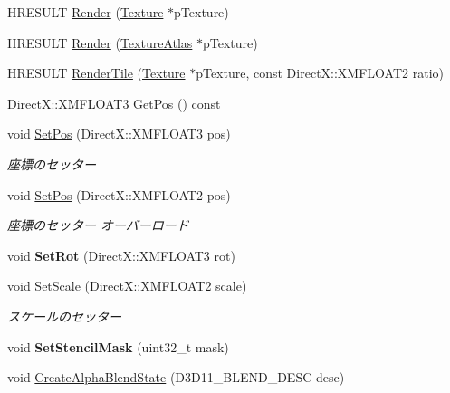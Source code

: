 \begin{DoxyCompactItemize}
\item 
H\+R\+E\+S\+U\+LT \hyperlink{class_a_p_i_1_1_sprite_af9c6b795e8d45972269d3fdc8cf9a3c4}{Render} (\hyperlink{class_a_p_i_1_1_texture}{Texture} $\ast$p\+Texture)
\item 
H\+R\+E\+S\+U\+LT \hyperlink{class_a_p_i_1_1_sprite_abea1a725dece7f8198dd4f0f9e95afb8}{Render} (\hyperlink{class_a_p_i_1_1_texture_atlas}{Texture\+Atlas} $\ast$p\+Texture)
\item 
H\+R\+E\+S\+U\+LT \hyperlink{class_a_p_i_1_1_sprite_a0d7e8aacecb8e343ea166b614398ce12}{Render\+Tile} (\hyperlink{class_a_p_i_1_1_texture}{Texture} $\ast$p\+Texture, const Direct\+X\+::\+X\+M\+F\+L\+O\+A\+T2 ratio)
\item 
Direct\+X\+::\+X\+M\+F\+L\+O\+A\+T3 \hyperlink{class_a_p_i_1_1_sprite_a471a0be5d782804468865b18a3eca5f1}{Get\+Pos} () const 
\item 
void \hyperlink{class_a_p_i_1_1_sprite_a966d3c6ff7e6bee56d3d8576d4585037}{Set\+Pos} (Direct\+X\+::\+X\+M\+F\+L\+O\+A\+T3 pos)\hypertarget{class_a_p_i_1_1_sprite_a966d3c6ff7e6bee56d3d8576d4585037}{}\label{class_a_p_i_1_1_sprite_a966d3c6ff7e6bee56d3d8576d4585037}

\begin{DoxyCompactList}\small\item\em 座標のセッター \end{DoxyCompactList}\item 
void \hyperlink{class_a_p_i_1_1_sprite_a40cf3dffabd00db79c9a7a70ade8ad16}{Set\+Pos} (Direct\+X\+::\+X\+M\+F\+L\+O\+A\+T2 pos)\hypertarget{class_a_p_i_1_1_sprite_a40cf3dffabd00db79c9a7a70ade8ad16}{}\label{class_a_p_i_1_1_sprite_a40cf3dffabd00db79c9a7a70ade8ad16}

\begin{DoxyCompactList}\small\item\em 座標のセッター  オーバーロード \end{DoxyCompactList}\item 
void {\bfseries Set\+Rot} (Direct\+X\+::\+X\+M\+F\+L\+O\+A\+T3 rot)\hypertarget{class_a_p_i_1_1_sprite_ac99b0e85c8f96e81093cbc13036aa07b}{}\label{class_a_p_i_1_1_sprite_ac99b0e85c8f96e81093cbc13036aa07b}

\item 
void \hyperlink{class_a_p_i_1_1_sprite_a4800713a43bf7b867abef7ad679ceb85}{Set\+Scale} (Direct\+X\+::\+X\+M\+F\+L\+O\+A\+T2 scale)\hypertarget{class_a_p_i_1_1_sprite_a4800713a43bf7b867abef7ad679ceb85}{}\label{class_a_p_i_1_1_sprite_a4800713a43bf7b867abef7ad679ceb85}

\begin{DoxyCompactList}\small\item\em スケールのセッター \end{DoxyCompactList}\item 
void {\bfseries Set\+Stencil\+Mask} (uint32\+\_\+t mask)\hypertarget{class_a_p_i_1_1_sprite_a016dc5cfc0bd53f3653b1ba35b4e6a17}{}\label{class_a_p_i_1_1_sprite_a016dc5cfc0bd53f3653b1ba35b4e6a17}

\item 
void \hyperlink{class_a_p_i_1_1_sprite_a043d0d75b247c2db2f011dc8b8621e58}{Create\+Alpha\+Blend\+State} (D3\+D11\+\_\+\+B\+L\+E\+N\+D\+\_\+\+D\+E\+SC desc)
\end{DoxyCompactItemize}
